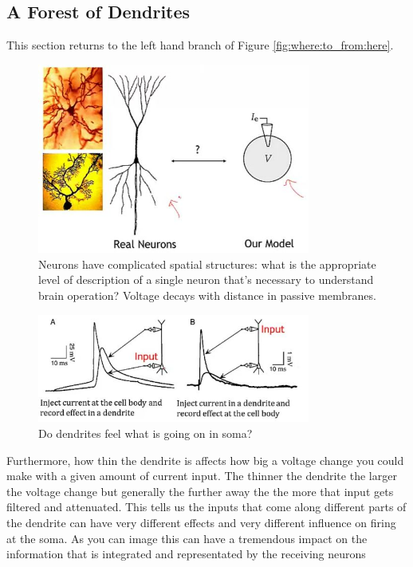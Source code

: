 \documentclass[]{article}
\begin{document}
\subsection{A Forest of Dendrites}\label{sec:a:forest:of:neurons}
This section returns to the left hand branch of Figure \ref{fig:where:to_from:here}.
\begin{figure}[H]
	\caption[Neurons have complicated spatial structures]{Neurons have complicated spatial structures: what is the appropriate
		level of description of a single neuron that's necessary to understand brain
		operation? Voltage decays with distance in passive membranes.}
	\includegraphics[width=0.8\textwidth]{neurons-have-complicated-spatial-structures}
\end{figure}

\begin{figure}[H]
	\caption[Do dendrites feel what is going on in soma?]{Do dendrites feel what is going on in soma?}
	\includegraphics[width=0.8\textwidth]{do-dendrites-feel-what-is-going-on-in-soma}
\end{figure}

 Furthermore, how thin the dendrite is
affects how big a voltage change you could make with a given amount of current
input. The thinner the dendrite the larger the
voltage change but generally the further away the the more that input gets
filtered and attenuated. This tells us the inputs that come along
different parts of the dendrite can have very different effects and very different
influence on firing at the soma. As you can image this can have a
tremendous impact on the information that is integrated and representated by the
receiving neurons
\end{document}
